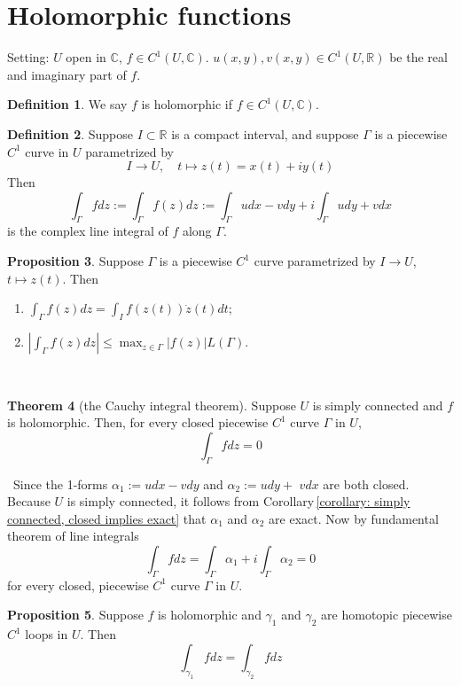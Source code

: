 \documentclass[12pt,a4paper]{book}
\newenvironment{prooff}{{\noindent\it\textcolor{cyan!40!black}{Proof}:}\,}{\par}
\newcommand{\bb}[1]{\mathbb{#1}}
\newenvironment{enu}{\begin{enumerate}[(1)]}{\end{enumerate}}
\theoremstyle{definition}
\newtheorem{defn}{Definition}[section]
\newtheorem{theo}[defn]{Theorem}
\newtheorem{prop}[defn]{Proposition}
\begin{document}
\section{Holomorphic functions}
Setting: $U$ open in $\bb{C}$, $f\in C^1(U,\bb{C})$. 
$u(x,y),v(x,y)\in C^1(U,\bb{R})$ be the real and imaginary part of $f$. 
\begin{defn}
    We say $f$ is holomorphic if $f\in C^1(U,\bb{C})$. 
\end{defn}
\begin{defn}
    Suppose $I \subset \mathbb{R}$ is a compact interval, and suppose $\Gamma$ is a piecewise $C^1$ curve in $U$ parametrized by
    $$
    I \rightarrow U, \quad t \mapsto z(t)=x(t)+i y(t)
    $$
    Then
    $$
    \int_{\Gamma} f d z:=\int_{\Gamma} f(z) d z:=\int_{\Gamma} u d x-v d y+i \int_{\Gamma} u d y+v d x
    $$
    is the complex line integral of $f$ along $\Gamma$.
\end{defn}
\begin{prop}
    Suppose $\Gamma$ is a piecewise $C^1$ curve parametrized by $I \rightarrow U$, $t \mapsto z(t)$. Then
\begin{enu}
\item $\int_{\Gamma} f(z) d z=\int_I f(z(t)) \dot{z}(t) d t$;
\item $\left|\int_{\Gamma} f(z) d z\right| \leq \max _{z \in \Gamma}|f(z)| L(\Gamma)$.
\end{enu}
\end{prop}
\begin{prooff}
    
\end{prooff}
\begin{theo}[the Cauchy integral theorem]
    Suppose $U$ is simply connected and $f$ is holomorphic. Then, for every closed piecewise $C^1$ curve $\Gamma$ in $U$,
$$
\int_{\Gamma} f d z=0
$$
\end{theo}
\begin{prooff}
    Since the 1-forms $\alpha_1:=u d x-v d y$ and $\alpha_2:=u d y+$ $v d x$ are both closed. 
    Because $U$ is simply connected, it follows from Corollary\,\ref{corollary: simply connected, closed implies exact} 
    that $\alpha_1$ and $\alpha_2$ are exact. 
    Now by fundamental theorem of line integrals
    $$
    \int_{\Gamma} f d z=\int_{\Gamma} \alpha_1+i \int_{\Gamma} \alpha_2=0
    $$
    for every closed, piecewise $C^1$ curve $\Gamma$ in $U$.
\end{prooff}
\begin{prop}
    Suppose $f$ is holomorphic and $\gamma_1$ and $\gamma_2$ are homotopic piecewise $C^1$ loops in $U$. Then
    $$
    \int_{\gamma_1} f d z=\int_{\gamma_2} f d z
    $$
\end{prop}
\end{document}
